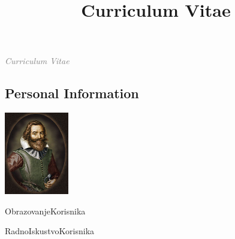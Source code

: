 \documentclass[11pt,a4paper,sans]{moderncv} %
\title{Curriculum Vitae}
\begin{document}
\textit{\Huge{\textcolor{gray}{Curriculum Vitae}}}

\hrulefill

\begin{multicols}{2}
  \section{Personal Information}
  \columnbreak
  \includegraphics[width=28mm, right]{pictures/picture.jpg}
\end{multicols}


ObrazovanjeKorisnika


RadnoIskustvoKorisnika
\end{document}
